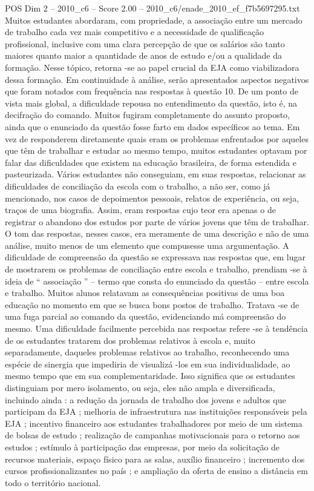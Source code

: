 \begin{textsample}{POS Dim 2 – 2010\_c6 – Score 2.00 – 2010\_c6/enade\_2010\_ef\_f7b5697295.txt}
Muitos estudantes abordaram, com propriedade, a associação entre um mercado de trabalho cada vez mais competitivo e a necessidade de qualificação profissional, inclusive com uma clara percepção de que os salários são tanto maiores quanto maior a quantidade de anos de estudo e/ou a qualidade da formação.
Nesse tópico, retorna -se ao papel crucial da EJA como viabilizadora dessa formação.
Em continuidade à análise, serão apresentados aspectos negativos que foram notados com frequência nas respostas à questão 10.
De um ponto de vista mais global, a dificuldade repousa no entendimento da questão, isto é, na decifração do comando.
Muitos fugiram completamente do assunto proposto, ainda que o enunciado da questão fosse farto em dados específicos ao tema.
Em vez de responderem diretamente quais eram os problemas enfrentados por aqueles que têm de trabalhar e estudar ao mesmo tempo, muitos estudantes optavam por falar das dificuldades que existem na educação brasileira, de forma estendida e pasteurizada.
Vários estudantes não conseguiam, em suas respostas, relacionar as dificuldades de conciliação da escola com o trabalho, a não ser, como já mencionado, nos casos de depoimentos pessoais, relatos de experiência, ou seja, traços de uma biografia.
Assim, eram respostas cujo teor era apenas o de registrar o abandono dos estudos por parte de vários jovens que têm de trabalhar.
O tom das respostas, nesses casos, era meramente de uma descrição e não de uma análise, muito menos de um elemento que compusesse uma argumentação.
A dificuldade de compreensão da questão se expressava nas respostas que, em lugar de mostrarem os problemas de conciliação entre escola e trabalho, prendiam -se à ideia de “ associação ” – termo que consta do enunciado da questão – entre escola e trabalho.
Muitos alunos relatavam as consequências positivas de uma boa educação no momento em que se busca bons postos de trabalho.
Tratava -se de uma fuga parcial ao comando da questão, evidenciando má compreensão do mesmo.
Uma dificuldade facilmente percebida nas respostas refere -se à tendência de os estudantes tratarem dos problemas relativos à escola e, muito separadamente, daqueles problemas relativos ao trabalho, reconhecendo uma espécie de sinergia que impediria de visualizá -los em sua individualidade, ao mesmo tempo que em sua complementaridade.
Isso significa que os estudantes distinguiam por mero isolamento, ou seja, eles não ampla e diversificada, incluindo ainda : a redução da jornada de trabalho dos jovens e adultos que participam da EJA ; melhoria de infraestrutura nas instituições responsáveis pela EJA ; incentivo financeiro aos estudantes trabalhadores por meio de um sistema de bolsas de estudo ; realização de campanhas motivacionais para o retorno aos estudos ; estímulo à participação das empresas, por meio da solicitação de recursos materiais, espaço físico para as salas, auxílio financeiro ; incremento dos cursos profissionalizantes no país ; e ampliação da oferta de ensino a distância em todo o território nacional.

\end{textsample}

